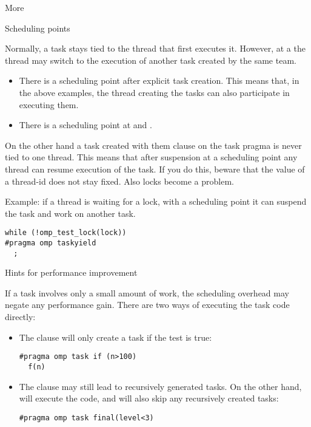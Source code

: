  {More}

 {Scheduling points}

Normally, a task stays tied to the thread that first executes it.
However, at a  the thread may
switch to the execution of another task created by the same team.
\begin{itemize}
\item There is a scheduling point after explicit task creation. This
  means that, in the above examples, the thread creating the tasks can
  also participate in executing them.
\item There is a scheduling point at  and .
\end{itemize}

On the other hand a task created with them  clause
on the task pragma is never tied to one thread. This means that after
suspension at a scheduling point any thread can resume execution of
the task.
If you do this, beware
that the value of a thread-id does not stay fixed. Also locks become a problem.

Example: if a thread is waiting for a lock, with a scheduling point it
can suspend the task and work on another task.
\begin{lstlisting}
while (!omp_test_lock(lock))
#pragma omp taskyield
  ;
\end{lstlisting}

 {Hints for performance improvement}
\label{sec:omp-task-hint}

If a task involves only a small amount of work,
the scheduling overhead may negate any performance gain.
There are two ways of executing the task code directly:
\begin{itemize}
\item The  clause will only create a task
  if the test is true:
\begin{lstlisting}
#pragma omp task if (n>100)
  f(n)
\end{lstlisting}
\item The  clause may still lead to recursively
  generated tasks. On the other hand, 
  will execute the code, and will also skip any recursively created tasks:
\begin{lstlisting}
#pragma omp task final(level<3)
\end{lstlisting}
\end{itemize}

